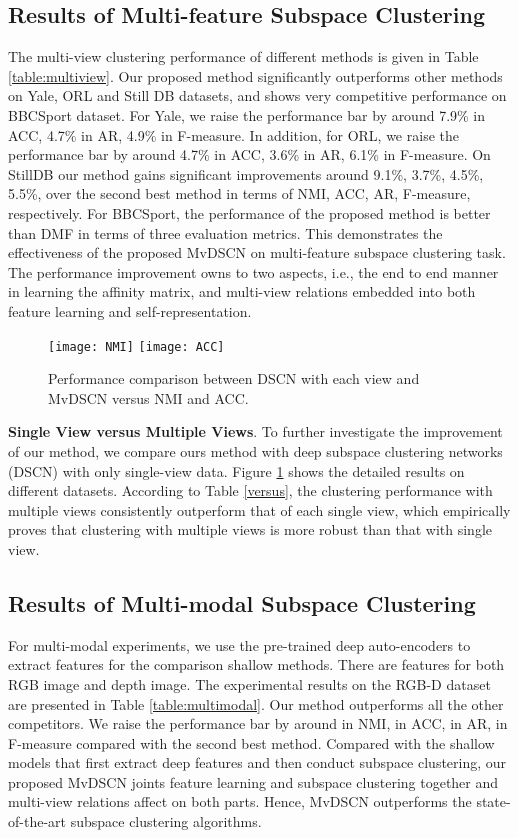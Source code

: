 \documentclass[journal]{IEEEtran}
\begin{document}
\subsection{Results of Multi-feature Subspace Clustering}
The multi-view clustering performance of different methods is given in Table \ref{table:multiview}.
Our proposed method significantly outperforms other methods on Yale, ORL and Still DB datasets, and shows very competitive performance on BBCSport dataset.
For Yale, we raise the performance bar by around 7.9\% in ACC, 4.7\% in AR, 4.9\% in F-measure.
In addition, for ORL, we raise the performance bar by around 4.7\% in ACC, 3.6\% in AR, 6.1\% in F-measure.
On StillDB our method gains significant improvements around 9.1\%, 3.7\%, 4.5\%, 5.5\%, over the second best method in terms of NMI, ACC, AR, F-measure, respectively.
For BBCSport, the performance of the proposed method is better than DMF in terms of three evaluation metrics.
This demonstrates the effectiveness of the proposed MvDSCN on multi-feature subspace clustering task.
The performance improvement owns to two aspects, i.e., the end to end manner in learning the affinity matrix, and multi-view relations embedded into both feature learning and self-representation.
\begin{figure}[!htbp]
	\centering
	\texttt{[image: NMI]}
	\texttt{[image: ACC]}
	\caption{Performance comparison between DSCN \cite{ji2017deep} with each view and MvDSCN versus NMI and ACC.}
	\label{fig:svsm}
\end{figure}

\textbf{Single View versus Multiple Views}.
To further investigate the improvement of our method, we compare ours method with deep subspace clustering networks (DSCN) \cite{ji2017deep} with only single-view data.
Figure \ref{fig:svsm} shows the detailed results on different datasets.
According to Table \ref{versus}, the clustering performance with multiple views consistently outperform that of each single view, which empirically proves that clustering with multiple views is more robust than that with single view.








\subsection{Results of Multi-modal Subspace Clustering}
For multi-modal experiments, we use the pre-trained deep auto-encoders to extract features for the comparison shallow methods.
There are  features for both RGB image and depth image.
The experimental results on the RGB-D dataset are presented in Table \ref{table:multimodal}.
Our method outperforms all the other competitors.
We raise the performance bar by around  in NMI,  in ACC,  in AR,  in F-measure compared with the second best method.
Compared with the shallow models that first extract deep features and then conduct subspace clustering, our proposed MvDSCN joints feature learning and subspace clustering together and multi-view relations affect on both parts. Hence, MvDSCN outperforms the state-of-the-art subspace clustering algorithms.
\end{document}
